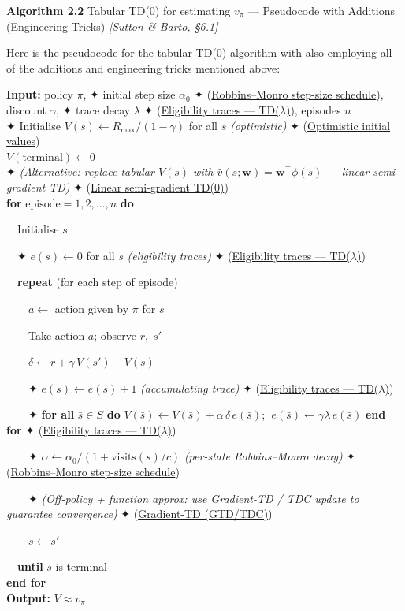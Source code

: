 \documentclass[11pt]{article}
\begin{document}
    \begin{pseudobox}

\textbf{Algorithm 2.2} Tabular TD(0) for estimating \(v_\pi\) ---
Pseudocode with Additions (Engineering Tricks) \emph{{[}Sutton \& Barto,
§6.1{]}}

\tcbline

Here is the pseudocode for the tabular TD(0) algorithm with also
employing all of the additions and engineering tricks mentioned above:

\textbf{Input:} policy \(\pi\), ✦ initial step size \(\alpha_0\) ✦
(\hyperref[trick-2-2-2]{Robbins--Monro step-size schedule}), discount
\(\gamma\), ✦ trace decay \(\lambda\) ✦
(\hyperref[trick-2-2-1]{Eligibility traces --- TD(\(\lambda\))}),
episodes \(n\)\\
✦ Initialise \(V(s) \leftarrow R_\text{max}/(1-\gamma)\) for all \(s\)
\emph{(optimistic)} ✦ (\hyperref[trick-2-2-3]{Optimistic initial
values})\\
\(V(\text{terminal}) \leftarrow 0\)\\
✦ \emph{(Alternative: replace tabular \(V(s)\) with
\(\hat v(s;\mathbf{w})=\mathbf{w}^\top\phi(s)\) --- linear semi-gradient
TD)} ✦ (\hyperref[trick-2-2-5]{Linear semi-gradient TD(0)})\\
\textbf{for} \(\text{episode} = 1, 2, \ldots, n\) \textbf{do}\\
\strut ~~Initialise \(s\)\\
\strut ~~✦ \(e(s) \leftarrow 0\) for all \(s\) \emph{(eligibility
traces)} ✦ (\hyperref[trick-2-2-1]{Eligibility traces ---
TD(\(\lambda\))})\\
\strut ~~\textbf{repeat} (for each step of episode)\\
\strut ~~~~\(a \leftarrow\) action given by \(\pi\) for \(s\)\\
\strut ~~~~Take action \(a\); observe \(r,\; s'\)\\
\strut ~~~~\(\delta \leftarrow r + \gamma\, V(s') - V(s)\)\\
\strut ~~~~✦ \(e(s) \leftarrow e(s) + 1\) \emph{(accumulating trace)} ✦
(\hyperref[trick-2-2-1]{Eligibility traces --- TD(\(\lambda\))})\\
\strut ~~~~✦ \textbf{for all} \(\bar s \in S\) \textbf{do}
\(V(\bar s) \leftarrow V(\bar s) + \alpha\,\delta\,e(\bar s)\);
\(\;e(\bar s) \leftarrow \gamma\lambda\,e(\bar s)\) \textbf{end for} ✦
(\hyperref[trick-2-2-1]{Eligibility traces --- TD(\(\lambda\))})\\
\strut ~~~~✦ \(\alpha \leftarrow \alpha_0/(1 + \mathrm{visits}(s)/c)\)
\emph{(per-state Robbins--Monro decay)} ✦
(\hyperref[trick-2-2-2]{Robbins--Monro step-size schedule})\\
\strut ~~~~✦ \emph{(Off-policy + function approx: use Gradient-TD / TDC
update to guarantee convergence)} ✦ (\hyperref[trick-2-2-4]{Gradient-TD
(GTD/TDC)})\\
\strut ~~~~\(s \leftarrow s'\)\\
\strut ~~\textbf{until} \(s\) is terminal\\
\textbf{end for}\\
\textbf{Output:} \(V \approx v_{\pi}\)

\end{pseudobox}
\end{document}
